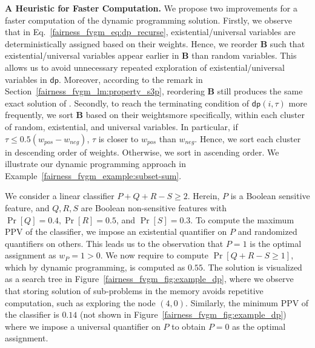 \textbf{A Heuristic for Faster Computation.} 
We propose two improvements for a faster computation of the dynamic programming solution. Firstly, we observe that in Eq.~\eqref{fairness_fvgm_eq:dp_recurse}, existential/universal variables are deterministically  assigned based on their weights. Hence, we reorder $ \mathbf{B} $ such that existential/universal variables appear earlier in $ \mathbf{B} $ than random variables. This allows us to avoid unnecessary repeated exploration of existential/universal variables in $ \mathsf{dp} $. Moreover, according to the remark in Section~\ref{fairness_fvgm_lm:property_s3p}, reordering $ \mathbf{B} $ still produces the same exact solution of {\stochastic}. Secondly, to reach the terminating condition of $ \mathsf{dp}(i, \tau) $ more frequently, we sort $ \mathbf{B} $ based on their weights\textemdash more specifically, within each cluster of random, existential, and universal variables. In particular, if $ \tau \le 0.5(w_{pos} - w_{neg}) $, $ \tau $ is closer to $ w_{pos} $ than $ w_{neg} $. Hence, we sort each cluster in descending order of weights. Otherwise,  we sort in ascending order. We illustrate our dynamic programming approach in Example~\ref{fairness_fvgm_example:subset-sum}.
	
\begin{example}\label{fairness_fvgm_example:subset-sum}
We consider a linear classifier $ P + Q + R - S \ge 2$. Herein, $ P $ is a Boolean sensitive feature, and $ Q, R, S $ are Boolean non-sensitive features with $ \Pr[Q] = 0.4,  \Pr[R] = 0.5 $, and $ \Pr[S] = 0.3 $. To compute the maximum PPV of the classifier,  we impose an existential quantifier on $P$ and randomized quantifiers on others. This leads us to the observation that $ P = 1 $ is the optimal assignment as $ w_P = 1 > 0 $. We now require to compute $ \Pr[Q + R - S \ge 1] $, which by dynamic programming, is computed as $ 0.55 $. The solution is visualized as a search tree in Figure~\ref{fairness_fvgm_fig:example_dp}, where we observe that storing solution of sub-problems in the memory avoids repetitive computation, such as exploring the node $ (4,0) $. Similarly, the minimum PPV  of the classifier is $ 0.14 $ (not shown in Figure~\ref{fairness_fvgm_fig:example_dp}) where we impose a universal quantifier on $P$ to obtain $ P = 0 $ as the optimal assignment. 
\end{example}

	
	